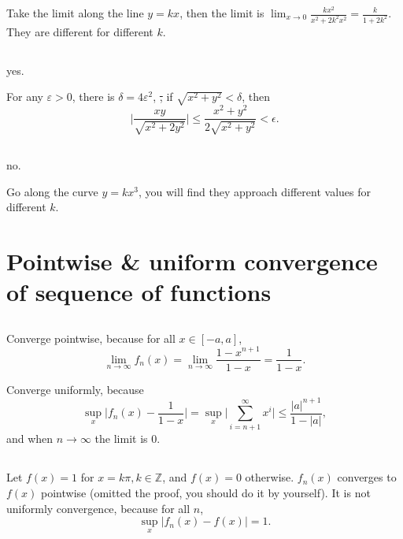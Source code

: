 Take the limit along the line \(y = kx\), then the limit is \(\lim_{x\to0}\frac{kx^2}{x^2 + 2k^2x^2} = \frac{k}{1 + 2k^2}\). They are different for different \(k\).

\subsection{}

yes.

For any \(\varepsilon>0\), there is \(\delta=4\varepsilon^2 \), \st, if \(\sqrt{x^2+y^2}<\delta \), then
\[\bigg|\frac{xy}{\sqrt{x^2+2y^2}}\bigg|\le \frac{x^2+y^2}{2\sqrt{x^2+y^2}} < \epsilon. \]


\subsection{}

no.

Go along the curve \(y=kx^3\), you will find they approach different values for different \(k\).

\section{Pointwise \& uniform convergence of sequence of functions} %

\subsection{} %

Converge pointwise, because for all \(x\in[-a,a]\),
\[\lim_{n\to\infty}f_n(x)=\lim_{n\to\infty}\frac{1-x^{n+1}}{1-x}=\frac{1}{1-x}.\]

Converge uniformly, because
\[\sup_x \bigg|f_n(x) - \frac{1}{1-x}\bigg| =\sup_x \bigg|\sum_{i=n+1}^\infty x^i\bigg|\le \frac{|a|^{n+1}}{1-|a|},\]
and when \(n\to\infty \) the limit is 0.

\subsection{} %

Let \(f(x) = 1\) for \(x=k\pi, k\in\mathbb{Z}\), and \(f(x) = 0\) otherwise.
\(f_n(x)\) converges to \(f(x)\) pointwise (omitted the proof, you should do it by yourself).
It is not uniformly convergence, because for all \(n\),
\[\sup_x |f_n(x)-f(x)| = 1.\]

\subsection{} %

